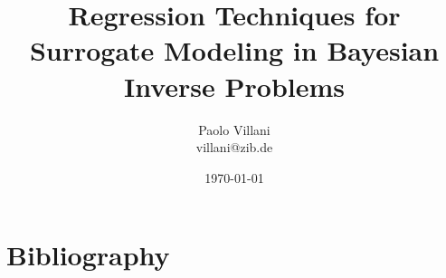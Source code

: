 \documentclass[10pt, a4paper, twoside]{article}
\begin{document}
\title{Regression Techniques for Surrogate Modeling in Bayesian Inverse Problems}
\author{Paolo Villani\\villani@zib.de}
\date{\today}

\pagestyle{fancy}
\pagestyle{fancyfront}


\newpage
{}


\pagestyle{fancymain}
\newpage
\tableofcontents
\newpage
{}

\newpage

\newpage

\newpage

\newpage

\newpage

\newpage



\newpage
\pagestyle{fancybib}
\section*{Bibliography}

\renewcommand\refname{}



\newpage
\pagestyle{fancyapp}
\appendix


\end{document}

